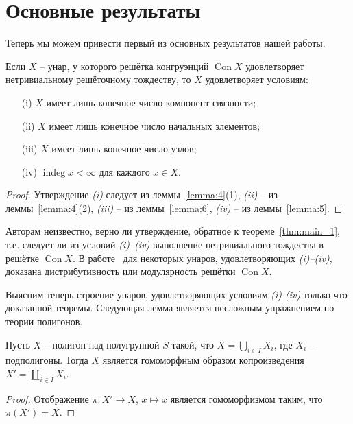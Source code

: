 \documentclass[11pt,twoside,final
]{article}
\def\Con{\operatorname{Con}}
\def\indeg{\operatorname{indeg}}
\begin{document}
\section{Основные результаты}

Теперь мы можем привести первый из основных результатов нашей работы.
\begin{theorem} \label{thm:main_1}
	Если $X$ -- унар, у которого решётка конгруэнций $\Con X$ удовлетворяет нетривиальному решёточному тождеству, то $X$ удовлетворяет условиям:
	\begin{enumerate}
		\item[(i)] $X$ имеет лишь конечное число компонент связности;
		\item[(ii)] $X$ имеет лишь конечное число начальных элементов;
		\item[(iii)] $X$ имеет лишь конечное число узлов;
		\item[(iv)] $\indeg x < \infty$ для каждого $x \in X$.
	\end{enumerate}
\end{theorem}
\begin{proof}
	Утверждение \textit{(i)} следует из леммы~\ref{lemma:4}(1), \textit{(ii)} -- из леммы~\ref{lemma:4}(2), \textit{(iii)} -- из леммы~\ref{lemma:6}, \textit{(iv)} -- из леммы~\ref{lemma:5}.
\end{proof}
Авторам неизвестно, верно ли утверждение, обратное к теореме~\ref{thm:main_1}, т.е. следует ли из условий \textit{(i)--(iv)} выполнение нетривиального тождества в решётке $\Con X$.
В работе~\cite{Egorova_4} для некоторых унаров, удовлетворяющих \textit{(i)--(iv)}, доказана дистрибутивность или модулярность решётки $\Con X$.

Выясним теперь строение унаров, удовлетворяющих условиям \textit{(i)-(iv)} только что доказанной теоремы.
Следующая лемма является несложным упражнением по теории полигонов.
\begin{lemma} \label{lemma:7}
	Пусть $X$ -- полигон над полугруппой $S$ такой, что $X = \bigcup_{i \in I} X_i$, где $X_i$ -- подполигоны.
	Тогда $X$ является гомоморфным образом копроизведения $X' = \coprod_{i \in I} X_i$.
\end{lemma}
\begin{proof}
	Отображение $\pi: X' \rightarrow X$, $x \mapsto x$ является гомоморфизмом таким, что $\pi(X') = X$.
\end{proof}
\end{document}

